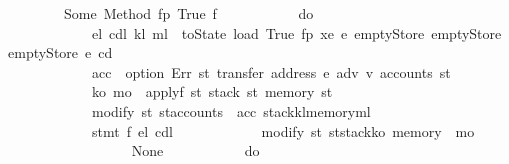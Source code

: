 \begin{isabellebody}
\ \ \ \ \ \ \ \ Some\ {\isacharparenleft}{\kern0pt}Method\ {\isacharparenleft}{\kern0pt}fp{\isacharcomma}{\kern0pt}\ True{\isacharcomma}{\kern0pt}\ f{\isacharparenright}{\kern0pt}{\isacharparenright}{\kern0pt}\ {\isasymRightarrow}\isanewline
\ \ \ \ \ \ \ \ \ \ do\ {\isacharbraceleft}{\kern0pt}\isanewline
\ \ \ \ \ \ \ \ \ \ \ \ {\isacharparenleft}{\kern0pt}e\isactrlsub l{\isacharcomma}{\kern0pt}\ cd\isactrlsub l{\isacharcomma}{\kern0pt}\ k\isactrlsub l{\isacharcomma}{\kern0pt}\ m\isactrlsub l{\isacharparenright}{\kern0pt}\ {\isasymleftarrow}\ toState\ {\isacharparenleft}{\kern0pt}load\ True\ fp\ xe\ e{\isacharprime}{\kern0pt}\ emptyStore\ emptyStore\ emptyStore\ e\ cd{\isacharparenright}{\kern0pt}{\isacharsemicolon}{\kern0pt}\isanewline
\ \ \ \ \ \ \ \ \ \ \ \ acc\ {\isasymleftarrow}\ option\ Err\ {\isacharparenleft}{\kern0pt}{\isasymlambda}st{\isachardot}{\kern0pt}\ transfer\ {\isacharparenleft}{\kern0pt}address\ e{\isacharparenright}{\kern0pt}\ adv\ v{\isacharprime}{\kern0pt}\ {\isacharparenleft}{\kern0pt}accounts\ st{\isacharparenright}{\kern0pt}{\isacharparenright}{\kern0pt}{\isacharsemicolon}{\kern0pt}\isanewline
\ \ \ \ \ \ \ \ \ \ \ \ {\isacharparenleft}{\kern0pt}k\isactrlsub o{\isacharcomma}{\kern0pt}\ m\isactrlsub o{\isacharparenright}{\kern0pt}\ {\isasymleftarrow}\ applyf\ {\isacharparenleft}{\kern0pt}{\isasymlambda}st{\isachardot}{\kern0pt}\ {\isacharparenleft}{\kern0pt}stack\ st{\isacharcomma}{\kern0pt}\ memory\ st{\isacharparenright}{\kern0pt}{\isacharparenright}{\kern0pt}{\isacharsemicolon}{\kern0pt}\isanewline
\ \ \ \ \ \ \ \ \ \ \ \ modify\ {\isacharparenleft}{\kern0pt}{\isasymlambda}st{\isachardot}{\kern0pt}\ st{\isasymlparr}accounts\ {\isacharcolon}{\kern0pt}{\isacharequal}{\kern0pt}\ acc{\isacharcomma}{\kern0pt}\ stack{\isacharcolon}{\kern0pt}{\isacharequal}{\kern0pt}k\isactrlsub l{\isacharcomma}{\kern0pt}memory{\isacharcolon}{\kern0pt}{\isacharequal}{\kern0pt}m\isactrlsub l{\isasymrparr}{\isacharparenright}{\kern0pt}{\isacharsemicolon}{\kern0pt}\isanewline
\ \ \ \ \ \ \ \ \ \ \ \ stmt\ f\ e\isactrlsub l\ cd\isactrlsub l{\isacharsemicolon}{\kern0pt}\isanewline
\ \ \ \ \ \ \ \ \ \ \ \ modify\ {\isacharparenleft}{\kern0pt}{\isasymlambda}st{\isachardot}{\kern0pt}\ st{\isasymlparr}stack{\isacharcolon}{\kern0pt}{\isacharequal}{\kern0pt}k\isactrlsub o{\isacharcomma}{\kern0pt}\ memory\ {\isacharcolon}{\kern0pt}{\isacharequal}{\kern0pt}\ m\isactrlsub o{\isasymrparr}{\isacharparenright}{\kern0pt}\isanewline
\ \ \ \ \ \ \ \ \ \ {\isacharbraceright}{\kern0pt}\isanewline
\ \ \ \ \ \ {\isacharbar}{\kern0pt}\ None\ {\isasymRightarrow}\isanewline
\ \ \ \ \ \ \ \ \ \ do\ {\isacharbraceleft}{\kern0pt}\isanewline

\end{isabellebody}
